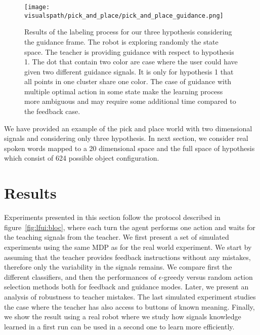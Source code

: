 \begin{figure}[!ht]
  \centering
  \texttt{[image: \\visualspath/pick\_and\_place/pick\_and\_place\_guidance.png]}
  \caption{Results of the labeling process for our three hypothesis considering the guidance frame. The robot is exploring randomly the state space. The teacher is providing guidance with respect to hypothesis 1. The dot that contain two color are case where the user could have given two different guidance signals. It is only for hypothesis 1 that all points in one cluster share one color. The case of guidance with multiple optimal action in some state make the learning process more ambiguous and may require some additional time compared to the feedback case.}
  \label{fig:lfui:pickplaceguidance}
\end{figure}

We have provided an example of the pick and place world with two dimensional signals and considering only three hypothesis. In next section, we consider real spoken words mapped to a 20 dimensional space and the full space of hypothesis which consist of 624 possible object configuration.

\section{Results}

Experiments presented in this section follow the protocol described in figure~\ref{fig:lfui:bloc}, where each turn the agent performs one action and waits for the teaching signals from the teacher. We first present a set of simulated experiments using the same MDP as for the real world experiment. We start by assuming that the teacher provides feedback instructions without any mistakes, therefore only the variability in the signals remains. We compare first the different classifiers, and then the performances of $\epsilon$-greedy versus random action selection methods both for feedback and guidance modes. Later, we present an analysis of robustness to teacher mistakes. The last simulated experiment studies the case where the teacher has also access to buttons of known meaning. Finally, we show the result using a real robot where we study how signals knowledge learned in a first run can be used in a second one to learn more efficiently.

